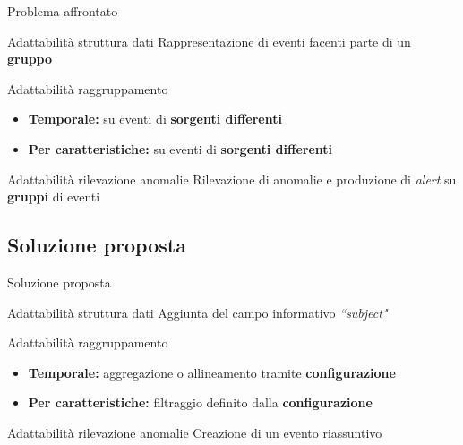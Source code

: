 \documentclass{beamer}
\begin{document}
	\begin{frame}{Problema affrontato}

		\begin{alertblock}{Adattabilità struttura dati}
			Rappresentazione di eventi facenti parte di un \textbf{gruppo} \vspace{.5em}
		\end{alertblock} \vspace{.2em}
		
		\begin{alertblock}{Adattabilità raggruppamento}
			\begin{itemize}
				\item \textbf{Temporale:} su eventi di \textbf{sorgenti differenti} \vspace{.5em}
				\item \textbf{Per caratteristiche:} su eventi di \textbf{sorgenti differenti} \vspace{.5em}
			\end{itemize}
		\end{alertblock}
		
		\begin{alertblock}{Adattabilità rilevazione anomalie}
			Rilevazione di anomalie e produzione di \textit{alert} su \textbf{gruppi} di eventi \vspace{.5em} 
		\end{alertblock}
	\end{frame}
	
	\subsection{Soluzione proposta}

	\begin{frame}{Soluzione proposta}
		\begin{exampleblock}{Adattabilità struttura dati}
			Aggiunta del campo informativo \textit{``subject"} 
		\end{exampleblock}
		
		\begin{exampleblock}{Adattabilità raggruppamento}
			\begin{itemize}
				\item \textbf{Temporale:} aggregazione o allineamento tramite \textbf{configurazione}\vspace{.5em}
				\item \textbf{Per caratteristiche:} filtraggio definito dalla \textbf{configurazione}  \vspace{.5em}
			\end{itemize}
		\end{exampleblock}
		
		\begin{exampleblock}{Adattabilità rilevazione anomalie}
			Creazione di un evento riassuntivo
		\end{exampleblock}
	\end{frame}
	
\end{document}
